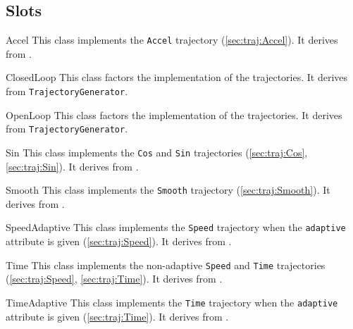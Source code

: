\subsection{Slots}

\begin{urbiscriptapi}
\item[Accel] This class implements the \lstinline|Accel| trajectory
  (\autoref{sec:traj:Accel}).  It derives from
  .

\item[ClosedLoop] This class factors the implementation of the
   trajectories.  It derives from
  \lstinline|TrajectoryGenerator|.

\item[OpenLoop] This class factors the implementation of the 
  trajectories.  It derives from \lstinline|TrajectoryGenerator|.

\item[Sin] This class implements the \lstinline|Cos| and \lstinline|Sin|
  trajectories (\autoref{sec:traj:Cos}, \autoref{sec:traj:Sin}).  It derives
  from .

\item[Smooth] This class implements the \lstinline|Smooth| trajectory
  (\autoref{sec:traj:Smooth}).  It derives from
  .

\item[SpeedAdaptive] This class implements the \lstinline|Speed| trajectory
  when the \lstinline|adaptive| attribute is given
  (\autoref{sec:traj:Speed}).  It derives from
  .

\item[Time] This class implements the non-adaptive \lstinline|Speed| and
  \lstinline|Time| trajectories (\autoref{sec:traj:Speed},
  \autoref{sec:traj:Time}).  It derives from
  .

\item[TimeAdaptive] This class implements the \lstinline|Time| trajectory
  when the \lstinline|adaptive| attribute is given
  (\autoref{sec:traj:Time}).  It derives from
  .
\end{urbiscriptapi}

